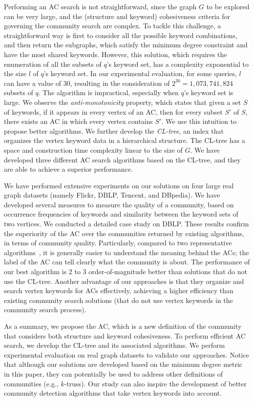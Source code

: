 Performing an AC search is not straightforward, since the graph $G$ to be explored can be very large, and the (structure and keyword) cohesiveness criteria for governing the community search are complex. To tackle this challenge, a straightforward way is first to consider all the possible keyword combinations, and then return the subgraphs,
which satisfy the minimum degree constraint and have the most shared keywords.
However, this solution, which requires the enumeration of all the subsets of $q$'s keyword set, has a complexity exponential to the size $l$ of $q$'s keyword set. In our experimental evaluation, for some queries, $l$ can have a value of 30, resulting in the consideration of $2^{30}=1,073,741,824$ subsets of $q$. The algorithm is impractical, especially when $q$'s keyword set is large. We observe the {\it anti-monotonicity} property, which states that given a set $S$ of keywords, if it appears in every vertex of an AC, then for every subset $S'$ of $S$, there exists an AC in which every vertex contains $S'$.
We use this intuition to propose better algorithms. We further develop the \emph{CL-tree}, an index that organizes the vertex keyword data in a hierarchical structure. The CL-tree has a space and construction time complexity linear to the size of $G$. We have developed three different AC search algorithms based on the CL-tree, and they are able to achieve a superior performance.

We have performed extensive experiments on our solutions on four large real graph datasets (namely Flickr, DBLP, Tencent, and DBpedia). We have developed several measures to measure the quality of a community, based on occurrence frequencies of keywords and similarity between the keyword sets of two vertices. We conducted a detailed case study on DBLP. These results confirm the superiority of the AC over the communities returned by existing algorithms, in terms of community quality.
Particularly, compared to two representative algorithms~\cite{KDD2010,local2014}, it is generally easier to understand the meaning behind the ACs;
the label of the AC can tell clearly what the community is about. The performance of our best algorithm is 2 to 3 order-of-magnitude better than solutions that do not use the CL-tree. Another advantage of our approaches is that they organize and search vertex keywords for ACs effectively, achieving a higher efficiency than existing community search solutions (that do not use vertex keywords in the community search process).

As a summary, we propose the AC, which is a new definition of the community that considers both structure and keyword cohesiveness. To perform efficient AC search, we develop the CL-tree and its associated algorithms. We perform experimental evaluation on real graph datasets to validate our approaches.  Notice that although our solutions are developed based on the minimum degree metric in this paper, they can potentially be used to address other definitions of communities (e.g., $k$-truss).  Our study can also inspire the development of better community detection algorithms that take vertex keywords into account.

